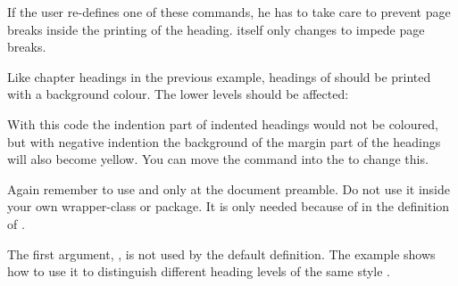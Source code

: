 If the user re-defines one of these commands, he has to take care to prevent
page breaks inside the printing of the heading. \KOMAScript{} itself only
changes  to impede page breaks.

\begin{Example}
  Like chapter headings in the previous example, headings of 
   should be printed with a background colour. The lower
  levels should be affected:
\begin{lstcode}
  \makeatletter
  \renewcommand{\sectionlinesformat}[4]{%
    \@tempswafalse
    \ifstr{#1}{section}{%
      \hspace*{#2}%
      \colorbox{yellow}{%
        \parbox{\dimexpr\linewidth-2\fboxrule-2\fboxsep-#2}{%
          \raggedsection
          \@hangfrom{#3}{#4}%
        }%
      }%
    }{%
      \@hangfrom{\hskip #2#3}{#4}%
    }%
  }
  \makeatother
\end{lstcode}
  With this code the indention part of indented headings would not be
  coloured, but with negative indention the background of the margin part of
  the headings will also become yellow. You can move the 
  command into the  to change this.

  Again remember to use  and  only at the
  document preamble. Do not use it inside your own wrapper-class or
  package. It is only needed because of  in the definition of
  .
\end{Example}

The first argument, , is not used by the default definition. The
example shows how to use it to distinguish different heading levels of the
same style .%
%
%



